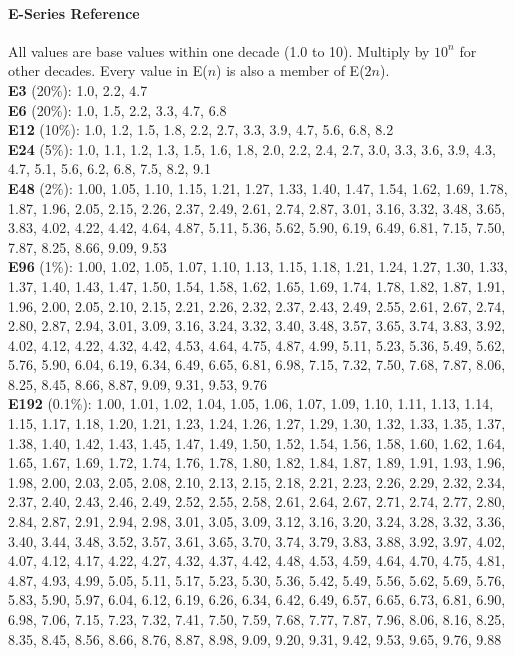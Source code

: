\paragraph{E-Series Reference}
All values are base values within one decade (1.0 to 10). Multiply by $10^n$ for other decades. Every value in E($n$) is also a member of E($2n$).\\
\textbf{E3} (20\%): 1.0, 2.2, 4.7\\
\textbf{E6} (20\%): 1.0, 1.5, 2.2, 3.3, 4.7, 6.8\\
\textbf{E12} (10\%): 1.0, 1.2, 1.5, 1.8, 2.2, 2.7, 3.3, 3.9, 4.7, 5.6, 6.8, 8.2\\
\textbf{E24} (5\%): 1.0, 1.1, 1.2, 1.3, 1.5, 1.6, 1.8, 2.0, 2.2, 2.4, 2.7, 3.0, 3.3, 3.6, 3.9, 4.3, 4.7, 5.1, 5.6, 6.2, 6.8, 7.5, 8.2, 9.1\\
\textbf{E48} (2\%): 1.00, 1.05, 1.10, 1.15, 1.21, 1.27, 1.33, 1.40, 1.47, 1.54, 1.62, 1.69, 1.78, 1.87, 1.96, 2.05, 2.15, 2.26, 2.37, 2.49, 2.61, 2.74, 2.87, 3.01, 3.16, 3.32, 3.48, 3.65, 3.83, 4.02, 4.22, 4.42, 4.64, 4.87, 5.11, 5.36, 5.62, 5.90, 6.19, 6.49, 6.81, 7.15, 7.50, 7.87, 8.25, 8.66, 9.09, 9.53\\
\textbf{E96} (1\%): 1.00, 1.02, 1.05, 1.07, 1.10, 1.13, 1.15, 1.18, 1.21, 1.24, 1.27, 1.30, 1.33, 1.37, 1.40, 1.43, 1.47, 1.50, 1.54, 1.58, 1.62, 1.65, 1.69, 1.74, 1.78, 1.82, 1.87, 1.91, 1.96, 2.00, 2.05, 2.10, 2.15, 2.21, 2.26, 2.32, 2.37, 2.43, 2.49, 2.55, 2.61, 2.67, 2.74, 2.80, 2.87, 2.94, 3.01, 3.09, 3.16, 3.24, 3.32, 3.40, 3.48, 3.57, 3.65, 3.74, 3.83, 3.92, 4.02, 4.12, 4.22, 4.32, 4.42, 4.53, 4.64, 4.75, 4.87, 4.99, 5.11, 5.23, 5.36, 5.49, 5.62, 5.76, 5.90, 6.04, 6.19, 6.34, 6.49, 6.65, 6.81, 6.98, 7.15, 7.32, 7.50, 7.68, 7.87, 8.06, 8.25, 8.45, 8.66, 8.87, 9.09, 9.31, 9.53, 9.76\\
\textbf{E192} (0.1\%): 1.00, 1.01, 1.02, 1.04, 1.05, 1.06, 1.07, 1.09, 1.10, 1.11, 1.13, 1.14, 1.15, 1.17, 1.18, 1.20, 1.21, 1.23, 1.24, 1.26, 1.27, 1.29, 1.30, 1.32, 1.33, 1.35, 1.37, 1.38, 1.40, 1.42, 1.43, 1.45, 1.47, 1.49, 1.50, 1.52, 1.54, 1.56, 1.58, 1.60, 1.62, 1.64, 1.65, 1.67, 1.69, 1.72, 1.74, 1.76, 1.78, 1.80, 1.82, 1.84, 1.87, 1.89, 1.91, 1.93, 1.96, 1.98, 2.00, 2.03, 2.05, 2.08, 2.10, 2.13, 2.15, 2.18, 2.21, 2.23, 2.26, 2.29, 2.32, 2.34, 2.37, 2.40, 2.43, 2.46, 2.49, 2.52, 2.55, 2.58, 2.61, 2.64, 2.67, 2.71, 2.74, 2.77, 2.80, 2.84, 2.87, 2.91, 2.94, 2.98, 3.01, 3.05, 3.09, 3.12, 3.16, 3.20, 3.24, 3.28, 3.32, 3.36, 3.40, 3.44, 3.48, 3.52, 3.57, 3.61, 3.65, 3.70, 3.74, 3.79, 3.83, 3.88, 3.92, 3.97, 4.02, 4.07, 4.12, 4.17, 4.22, 4.27, 4.32, 4.37, 4.42, 4.48, 4.53, 4.59, 4.64, 4.70, 4.75, 4.81, 4.87, 4.93, 4.99, 5.05, 5.11, 5.17, 5.23, 5.30, 5.36, 5.42, 5.49, 5.56, 5.62, 5.69, 5.76, 5.83, 5.90, 5.97, 6.04, 6.12, 6.19, 6.26, 6.34, 6.42, 6.49, 6.57, 6.65, 6.73, 6.81, 6.90, 6.98, 7.06, 7.15, 7.23, 7.32, 7.41, 7.50, 7.59, 7.68, 7.77, 7.87, 7.96, 8.06, 8.16, 8.25, 8.35, 8.45, 8.56, 8.66, 8.76, 8.87, 8.98, 9.09, 9.20, 9.31, 9.42, 9.53, 9.65, 9.76, 9.88


